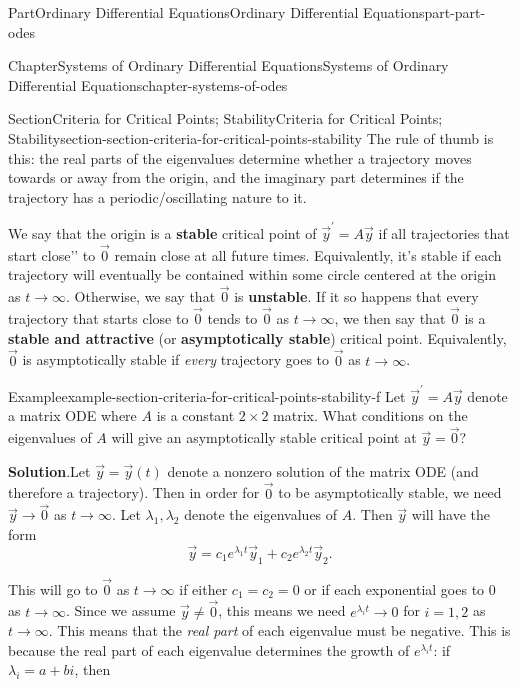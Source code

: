 \documentclass[twoside,10pt,]{book}
\newcommand{\blocktitlefont}{\relax}
\newcommand{\terminology}[1]{\textbf{#1}}
\numberwithin{equation}{part}
\begin{document}
\begin{partptx}{Part}{Ordinary Differential Equations}{}{Ordinary Differential Equations}{}{}{part-part-odes}
\begin{chapterptx}{Chapter}{Systems of Ordinary Differential Equations}{}{Systems of Ordinary Differential Equations}{}{}{chapter-systems-of-odes}
\begin{sectionptx}{Section}{Criteria for Critical Points; Stability}{}{Criteria for Critical Points; Stability}{}{}{section-section-criteria-for-critical-points-stability}
The rule of thumb is this: the real parts of the eigenvalues determine whether a trajectory moves towards or away from the origin, and the imaginary part determines if the trajectory has a periodic\slash{}oscillating nature to it.%
\par
We say that the origin is a \terminology{stable} critical point of \(\vec{y}^\prime=A\vec{y}\) if all trajectories that start \textasciigrave{}\textasciigrave{}close'{}'{} to \(\vec{0}\) remain close at all future times. Equivalently, it's stable if each trajectory will eventually be contained within some circle centered at the origin as \(t\to\infty\). Otherwise, we say that \(\vec{0}\) is \terminology{unstable}. If it so happens that every trajectory that starts close to \(\vec{0}\) tends to \(\vec{0}\) as \(t\to\infty\), we then say that \(\vec{0}\) is a \terminology{stable and attractive} (or \terminology{asymptotically stable}) critical point. Equivalently, \(\vec{0}\) is asymptotically stable if \emph{every} trajectory goes to \(\vec{0}\) as \(t\to\infty\).%
\begin{example}{Example}{}{example-section-criteria-for-critical-points-stability-f}%
Let \(\vec{y}^\prime = A\vec{y}\) denote a matrix ODE where \(A\) is a constant \(2\times2\) matrix. What conditions on the eigenvalues of \(A\) will give an asymptotically stable critical point at \(\vec{y}=\vec{0}\)?%
\par\smallskip%
\noindent\textbf{\blocktitlefont Solution}.\hypertarget{solution-section-criteria-for-critical-points-stability-f-b}{}\quad{}Let \(\vec{y} = \vec{y}(t)\) denote a nonzero solution of the matrix ODE (and therefore a trajectory). Then in order for \(\vec{0}\) to be asymptotically stable, we need \(\vec{y}\to\vec{0}\) as \(t\to\infty\). Let \(\lambda_{1},\lambda_{2}\) denote the eigenvalues of \(A\). Then \(\vec{y}\) will have the form%
\begin{equation*}
\vec{y} = c_{1}e^{\lambda_{1}t}\vec{y}_{1}+c_{2}e^{\lambda_{2}t}\vec{y}_{2}.
\end{equation*}
%
\par
This will go to \(\vec{0}\) as \(t\to\infty\) if either \(c_{1}=c_{2}=0\) or if each exponential goes to \(0\) as \(t\to\infty\). Since we assume \(\vec{y}\neq\vec{0}\), this means we need \(e^{\lambda_{i}t}\to0\) for \(i=1,2\) as \(t\to\infty\). This means that the \emph{real part} of each eigenvalue must be negative. This is because the real part of each eigenvalue determines the growth of \(e^{\lambda_{i}t}\): if \(\lambda_{i} = a+bi\), then%
\begin{equation*}

\end{equation*}
\end{example}
\end{sectionptx}
\end{chapterptx}
\end{partptx}
\end{document}
